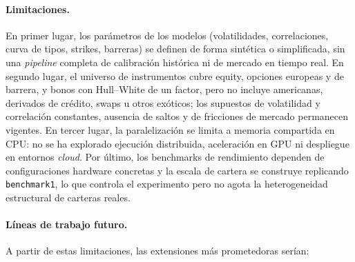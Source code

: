 \documentclass[11pt]{article}
\begin{document}
\paragraph{Limitaciones.}
En primer lugar, los parámetros de los modelos (volatilidades, correlaciones, curva de tipos, strikes, barreras) se definen de forma sintética o simplificada, sin una \emph{pipeline} completa de calibración histórica ni de mercado en tiempo real.
En segundo lugar, el universo de instrumentos cubre equity, opciones europeas y de barrera, y bonos con Hull--White de un factor, pero no incluye americanas, derivados de crédito, swaps u otros exóticos; los supuestos de volatilidad y correlación constantes, ausencia de saltos y de fricciones de mercado permanecen vigentes.
En tercer lugar, la paralelización se limita a memoria compartida en CPU: no se ha explorado ejecución distribuida, aceleración en GPU ni despliegue en entornos \emph{cloud}.
Por último, los benchmarks de rendimiento dependen de configuraciones hardware concretas y la escala de cartera se construye replicando \texttt{benchmark1}, lo que controla el experimento pero no agota la heterogeneidad estructural de carteras reales.

\paragraph{Líneas de trabajo futuro.}
A partir de estas limitaciones, las extensiones más prometedoras serían:
\end{document}
